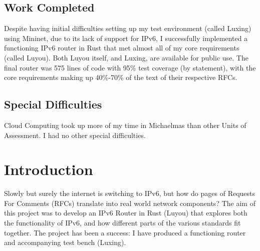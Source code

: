 \documentclass[12pt,a4paper,twoside,openany]{report}
\begin{document}
\section*{Work Completed}

Despite having initial difficulties setting up my test environment (called Luxing) using Mininet\cite{mininet}, due to its lack of support for IPv6, I successfully implemented a functioning IPv6 router in Rust that met almost all of my core requirements (called Luyou). Both Luyou itself, and Luxing, are available for public use\cite{repo}.  The final router was 575 lines of code with 95\% test coverage (by statement), with the core requirements making up 40\%-70\% of the text of their respective RFCs. 

\section*{Special Difficulties}

Cloud Computing took up more of my time in Michaelmas than other Units of Assessment. I had no other special difficulties.

\tableofcontents
{}
\listoffigures
{}


\pagestyle{headings}

\chapter{Introduction}
\label{chap::introduction}
Slowly but surely the internet is switching to IPv6\cite{ipv6_rfc}, but how do pages of Requests For Comments (RFCs) translate into real world network components? The aim of this project was to develop an IPv6 Router in Rust (Luyou) that explores both the functionality of IPv6, and how different parts of the various standards fit together. The project has been a success: I have produced a functioning router and accompanying test bench (Luxing).

\bigskip
\end{document}
